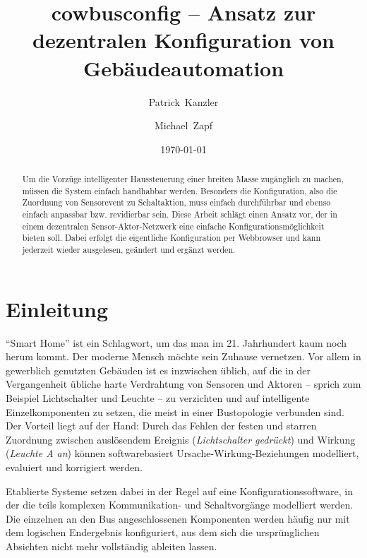 \documentclass{IEEEtran}
\begin{document}
\title{cowbusconfig -- Ansatz zur dezentralen Konfiguration von Gebäudeautomation}
\author{Patrick~Kanzler \and Michael~Zapf}
\date{\today}



\maketitle


\begin{abstract}
    Um die Vorzüge intelligenter Haussteuerung einer breiten Masse zugänglich
    zu machen, müssen die System einfach handhabbar werden.
    Besonders die Konfiguration, also die Zuordnung von Sensorevent zu
    Schaltaktion, muss einfach durchführbar und ebenso einfach anpassbar
    bzw. revidierbar sein. Diese Arbeit schlägt einen Ansatz vor,
    der in einem dezentralen Sensor-Aktor-Netzwerk eine einfache
    Konfigurationsmöglichkeit bieten soll.
    Dabei erfolgt die eigentliche Konfiguration per Webbrowser und kann
    jederzeit wieder ausgelesen, geändert und ergänzt werden.
\end{abstract}

\section{Einleitung}
    \enquote{Smart Home} ist ein Schlagwort, um das man im 21. Jahrhundert
    kaum noch herum kommt. Der moderne Mensch möchte sein Zuhause vernetzen.
    Vor allem in gewerblich genutzten Gebäuden ist es inzwischen üblich,
    auf die in der Vergangenheit übliche harte Verdrahtung von Sensoren und
    Aktoren -- sprich zum Beispiel Lichtschalter und Leuchte -- zu verzichten
    und auf intelligente Einzelkomponenten zu setzen, die meist in einer
    Bustopologie verbunden sind. Der Vorteil liegt auf der Hand:
    Durch das Fehlen der festen und starren Zuordnung zwischen auslösendem
    Ereignis (\emph{Lichtschalter gedrückt}) und Wirkung (\emph{Leuchte A an})
    können softwarebasiert Ursache-Wirkung-Beziehungen modelliert, evaluiert
    und korrigiert werden.

    Etablierte Systeme setzen dabei in der Regel auf eine
    Konfigurationssoftware, in der die teils komplexen Kommunikation- und
    Schaltvorgänge modelliert werden.
    Die einzelnen an den Bus angeschlossenen Komponenten werden häufig nur
    mit dem logischen Endergebnis konfiguriert,
    aus dem sich die ursprünglichen Absichten nicht mehr vollständig ableiten
    lassen.
\end{document}
